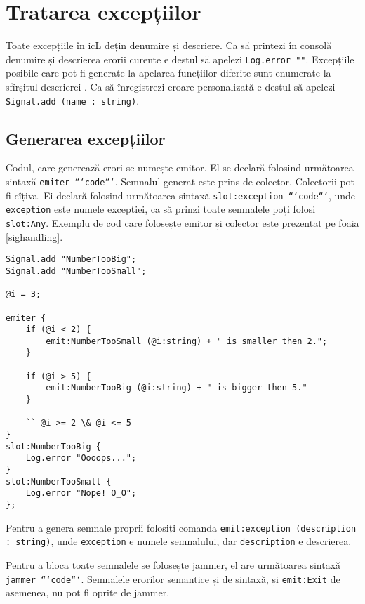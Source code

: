 \section{Tratarea excepțiilor}

Toate excepțiile în icL dețin denumire și descriere. Ca să printezi în consolă denumire și descrierea erorii curente e destul să apelezi \texttt{Log.error ""}. Excepțiile posibile care pot fi generate la apelarea funcțiilor diferite sunt enumerate la sfîrșitul descrierei . Ca să înregistrezi eroare personalizată e destul să apelezi \texttt{Signal.add (name : string)}.

\subsection{Generarea excepțiilor}

Codul, care generează erori se numește emitor. El se declară folosind următoarea sintaxă \texttt{emiter {```code```}}. Semnalul generat este prins de colector. Colectorii pot fi cîțiva. Ei declară folosind următoarea sintaxă \texttt{slot:exception {```code```}},
unde \texttt{exception} este numele excepției, ca să prinzi toate semnalele poți folosi \texttt{slot:Any}. Exemplu de cod care folosește emitor și colector este prezentat pe foaia \ref{sighandling}.

\begin{sourcecode}
\label{sighandling}
\begin{verbatim}
Signal.add "NumberTooBig";
Signal.add "NumberTooSmall";

@i = 3;

emiter {
	if (@i < 2) {
		emit:NumberTooSmall (@i:string) + " is smaller then 2.";
	}

	if (@i > 5) {
		emit:NumberTooBig (@i:string) + " is bigger then 5."
	}

	`` @i >= 2 \& @i <= 5
}
slot:NumberTooBig {
	Log.error "Oooops...";
}
slot:NumberTooSmall {
	Log.error "Nope! O_O";
};
\end{verbatim}
\end{sourcecode}

Pentru a genera semnale proprii folosiți comanda \texttt{emit:exception (description : string)}, unde \texttt{exception} e numele semnalului, dar \texttt{description} e descrierea.

Pentru a bloca toate semnalele se folosește jammer, el are următoarea sintaxă \texttt{jammer {```code```}}. Semnalele erorilor semantice și de sintaxă, și \texttt{emit:Exit} de asemenea, nu pot fi oprite de jammer.


